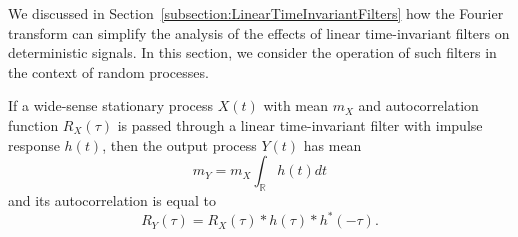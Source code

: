 We discussed in Section~\ref{subsection:LinearTimeInvariantFilters} how the Fourier transform can simplify the analysis of the effects of linear time-invariant filters on deterministic signals.
In this section, we consider the operation of such filters in the context of random processes.

\begin{theorem} \label{theorem:filteredWSS}
If a wide-sense stationary process $X(t)$ with mean $m_X$ and autocorrelation function $R_X(\tau)$ is passed through a linear time-invariant filter with impulse response $h(t)$, then the output process $Y(t)$ has mean
\begin{equation*}
m_Y = m_X \int_{\mathbb{R}} h(t) dt
\end{equation*}
and its autocorrelation is equal to
\begin{equation*}
R_Y (\tau) = R_X(\tau) \ast h(\tau) \ast h^*(-\tau) .
\end{equation*}
\end{theorem}
